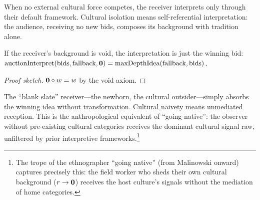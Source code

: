 When no external cultural force competes, the receiver interprets only
through their default framework.  Cultural isolation means self-referential
interpretation: the audience, receiving no new bids, composes its background
with tradition alone.

\begin{theorem}
\label{thm:void-receiver}
If the receiver's background is void, the interpretation is just the winning
bid:
$\operatorname{auctionInterpret}(\text{bids}, \text{fallback}, \mathbf{0}) =
\operatorname{maxDepthIdea}(\text{fallback}, \text{bids})$.
\end{theorem}

\begin{proof}[Proof sketch]
$\mathbf{0} \circ w = w$ by the void axiom.
\end{proof}

The ``blank slate'' receiver---the newborn, the cultural outsider---simply
absorbs the winning idea without transformation.  Cultural naivety means
unmediated reception.  This is the anthropological equivalent of ``going
native'': the observer without pre-existing cultural categories receives the
dominant cultural signal raw, unfiltered by prior interpretive
frameworks.\footnote{The trope of the ethnographer ``going native'' (from
Malinowski onward) captures precisely this: the field worker who sheds their
own cultural background ($r \to \mathbf{0}$) receives the host culture's signals
without the mediation of home categories.}

